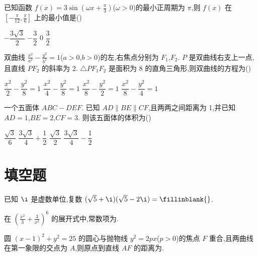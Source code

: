 \begin{problem}
已知函数 \(f(x)=3\sin \left( \omega x+\frac{\pi}{3} \right)\)(\(\omega>0\))的最小正周期为 \(\pi\),则 \(f(x)\) 在 \(\left[-\frac{\pi}{12},\frac{\pi}{6}\right]\) 上的最小值是(\quad)

\choices
    {\(-\dfrac{3\sqrt3}{2}\)}
    {\(-\dfrac32\)}
    {0}
    {\(\dfrac32\)}
\end{problem}

\begin{problem}
双曲线 \(\frac{x^2}{a^2}-\frac{y^2}{b^2}=1\)(\(a>0\),\(b>0\))的左,右焦点分别为 \(F_1\),\(F_2\). \(P\) 是双曲线右支上一点,且直线 \(PF_2\) 的斜率为 2. \(\triangle PF_1F_2\) 是面积为 8 的直角三角形,则双曲线的方程为(\quad)

\choices
    {\(\dfrac{x^2}{2}-\dfrac{y^2}{8}=1\)}
    {\(\dfrac{x^2}{4}-\dfrac{y^2}{8}=1\)}
    {\(\dfrac{x^2}{8}-\dfrac{y^2}{2}=1\)}
    {\(\dfrac{x^2}{8}-\dfrac{y^2}{4}=1\)}
\end{problem}

\begin{problem}
一个五面体 \(ABC-DEF\). 已知 \(AD\parallel BE\parallel CF\),且两两之间距离为 1,并已知 \(AD=1\),\(BE=2\),\(CF=3\). 则该五面体的体积为(\quad)


\choices
    {\(\dfrac{\sqrt3}{6}\)}
    {\(\dfrac{3\sqrt3}{4}+\dfrac12\)}
    {\(\dfrac{\sqrt3}{2}\)}
    {\(\dfrac{3\sqrt3}{4}-\dfrac12\)}
\end{problem}

\section{填空题}

\begin{problem}
已知 \(\i\) 是虚数单位,复数 \((\sqrt5+\i)(\sqrt5-2\i)=\fillinblank{}\).
\end{problem}

\begin{problem}
在 \(\left(\frac{x^2}{3}+\frac{3}{x^2}\right)^6\) 的展开式中,常数项为\fillinblank{}.
\end{problem}

\begin{problem}
圆 \((x-1)^2+y^2=25\) 的圆心与抛物线 \(y^2=2px\)(\(p>0\))的焦点 \(F\) 重合,且两曲线在第一象限的交点为 \(A\),则原点到直线 \(AF\) 的距离为\fillinblank{}.
\end{problem}

